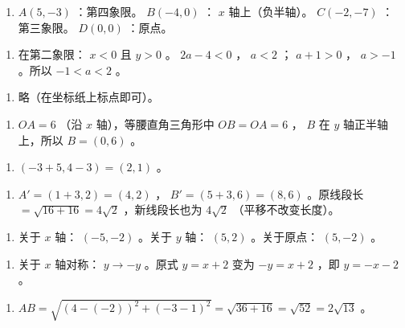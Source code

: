 \begin{answer}


\begin{enumerate}
  \item $A(5, -3)$ ：第四象限。 $B(-4, 0)$ ： $x$ 轴上（负半轴）。 $C(-2, -7)$ ：第三象限。 $D(0, 0)$ ：原点。
\end{enumerate}


\begin{enumerate}
  \item 在第二象限： $x < 0$ 且 $y > 0$ 。 $2a - 4 < 0$ ， $a < 2$ ； $a + 1 > 0$ ， $a > -1$ 。所以 $-1 < a < 2$ 。
\end{enumerate}


\begin{enumerate}
  \item 略（在坐标纸上标点即可）。
\end{enumerate}


\begin{enumerate}
  \item $OA = 6$ （沿 $x$ 轴），等腰直角三角形中 $OB = OA = 6$ ， $B$ 在 $y$ 轴正半轴上，所以 $B = (0, 6)$ 。
\end{enumerate}


\begin{enumerate}
  \item $(-3 + 5, 4 - 3) = (2, 1)$ 。
\end{enumerate}


\begin{enumerate}
  \item $A' = (1+3, 2) = (4, 2)$ ， $B' = (5+3, 6) = (8, 6)$ 。原线段长 $= \sqrt{16+16} = 4\sqrt{2}$ ，新线段长也为 $4\sqrt{2}$ （平移不改变长度）。
\end{enumerate}


\begin{enumerate}
  \item 关于 $x$ 轴： $(-5, -2)$ 。关于 $y$ 轴： $(5, 2)$ 。关于原点： $(5, -2)$ 。
\end{enumerate}


\begin{enumerate}
  \item 关于 $x$ 轴对称： $y \to -y$ 。原式 $y = x + 2$ 变为 $-y = x + 2$ ，即 $y = -x - 2$ 。
\end{enumerate}


\begin{enumerate}
  \item $AB = \sqrt{(4-(-2))^2 + (-3-1)^2} = \sqrt{36 + 16} = \sqrt{52} = 2\sqrt{13}$ 。
\end{enumerate}



\end{answer}
